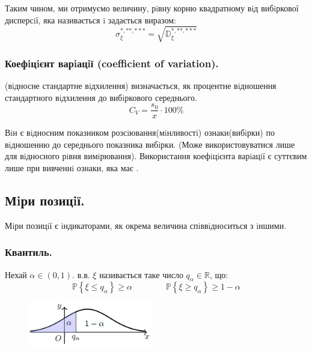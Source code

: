 Таким чином, ми отримуємо величину, рiвну корню квадратному вiд вибiркової дисперсiї, яка називається  i задається виразом:
$$
\sigma_{\xi}^{*, **, ***} = \sqrt{\mathbb{D}_{\xi}^{*, **, ***}}
$$
\subsubsection{Коефiцiєнт варiацiї (coefficient of variation).}
 (вiдносне стандартне вiдхилення) визначається, як процентне вiдношення стандартного вiдхилення до вибiркового середнього.
$$
C_V = \frac{s_0}{x} \cdot 100\%
$$
\begin{remark}
Вiн є вiдносним показником розсiювання(мiнливостi) ознаки(вибiрки) по вiдношенню до середнього показника вибiрки. (Може використовуватися лише для вiдносного рiвня вимiрювання).
Використання коефiцiєнта варiацiї є суттєвим лише при вивченнi ознаки, яка має .
\end{remark}
\newpage
\subsection{Мiри позицiї.}
Мiри позицiї є iндикаторами, як окрема величина спiввiдноситься з iншими.
\subsubsection{Квантиль.}
  Нехай $\alpha \in (0,1)$.  в.в. $\xi$ називається
таке число $q_{\alpha} \in \mathbb{R}$, що:
$$
\mathbb{P} \left\lbrace \xi \leq q_{\alpha} \right\rbrace \geq \alpha \qquad \qquad \mathbb{P} \left\lbrace \xi\geq q_{\alpha} \right\rbrace \geq 1 - \alpha
$$
\begin{figure}
\vspace*{-2em}
\centering
\includegraphics[width=0.48\textwidth]{assets/lectures_part_5-94f6ab31.png}
\end{figure}

